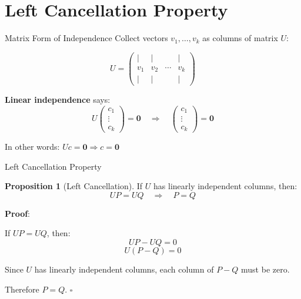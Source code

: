 \documentclass[10pt]{beamer}
\theoremstyle{definition}
\newtheorem{prop}{Proposition}[section]
\newcommand{\x}[1]{\alert{\textbf{#1}}}
\begin{document}
\section{Left Cancellation Property}

\begin{frame}{Matrix Form of Independence}
Collect vectors $v_1, \ldots, v_k$ as columns of matrix $U$:

$$U = \begin{pmatrix} | & | & & | \\ v_1 & v_2 & \cdots & v_k \\ | & | & & | \end{pmatrix}$$

\vfill
\x{Linear independence} says:
$$U\begin{pmatrix} c_1 \\ \vdots \\ c_k \end{pmatrix} = \mathbf{0} \quad \Rightarrow \quad \begin{pmatrix} c_1 \\ \vdots \\ c_k \end{pmatrix} = \mathbf{0}$$

In other words: $Uc = \mathbf{0} \Rightarrow c = \mathbf{0}$
\end{frame}

\begin{frame}{Left Cancellation Property}
\begin{prop}[Left Cancellation]
If $U$ has linearly independent columns, then:
$$UP = UQ \quad \Rightarrow \quad P = Q$$
\end{prop}

\vfill
\textbf{Proof}:

If $UP = UQ$, then:
$$UP - UQ = 0$$
$$U(P - Q) = 0$$

Since $U$ has linearly independent columns, each column of $P - Q$ must be zero.

Therefore $P = Q$. $\square$
\end{frame}
\end{document}
